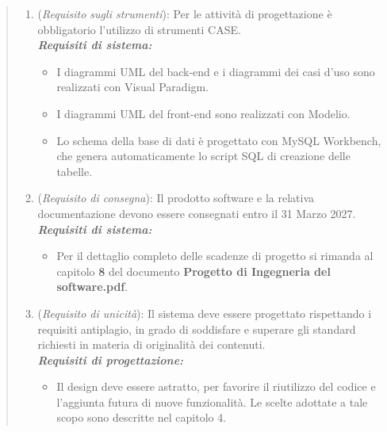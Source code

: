 \begin{quote}
\begin{enumerate}[label=\textit{RO\arabic*}]
  \item (\textit{Requisito sugli strumenti}): Per le attività di progettazione è obbligatorio l'utilizzo di strumenti CASE. \\
  \textbf{\textit{Requisiti di sistema:}} 
    \begin{itemize}
        \item I diagrammi UML del back-end e i diagrammi dei casi d'uso sono realizzati con Visual Paradigm.
  \item I diagrammi UML del front-end sono realizzati con Modelio.
  \item Lo schema della base di dati è progettato con MySQL Workbench, che genera automaticamente lo script SQL di creazione delle tabelle.
    \end{itemize}

  
  \item (\textit{Requisito di consegna}): Il prodotto software e la relativa documentazione devono essere consegnati entro il 31 Marzo 2027. \\
  \textbf{\textit{Requisiti di sistema:}} 
    \begin{itemize}
        \item Per il dettaglio completo delle scadenze di progetto si rimanda al capitolo \textbf{8} del documento \textbf{Progetto di Ingegneria del software.pdf}. 
    \end{itemize}
  
  \item (\textit{Requisito di unicità}): Il sistema deve essere progettato rispettando i requisiti antiplagio, in grado di soddisfare e superare gli standard richiesti in materia di originalità dei contenuti. \\
  \textbf{\textit{Requisiti di progettazione:}} 
    \begin{itemize}
        \item Il design deve essere astratto, per favorire il riutilizzo del codice e l'aggiunta futura di nuove funzionalità. Le scelte adottate a tale scopo sono descritte nel capitolo 4.
    \end{itemize}
\end{enumerate} 
\end{quote}